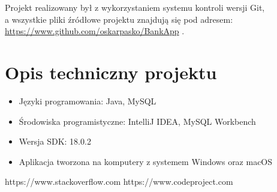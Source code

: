 \documentclass[12pt, letterpaper]{article}
\begin{document}
\quad Projekt realizowany był z wykorzystaniem systemu kontroli wersji Git,\\ a wszystkie pliki źródłowe projektu znajdują się pod adresem:\\  \url{https://www.github.com/oskarpasko/BankApp} . 

\section{Opis techniczny projektu}
\begin{itemize}
\item Języki programowania: Java, MySQL
\item Środowiska programistyczne: IntelliJ IDEA, MySQL Workbench
\item Wersja SDK: 18.0.2
\item Aplikacja tworzona na komputery z systemem Windows oraz macOS
\end{itemize}

\newpage


\begin{thebibliography}{9}

https://www.stackoverflow.com
https://www.codeproject.com

\end{thebibliography}
\end{document}
